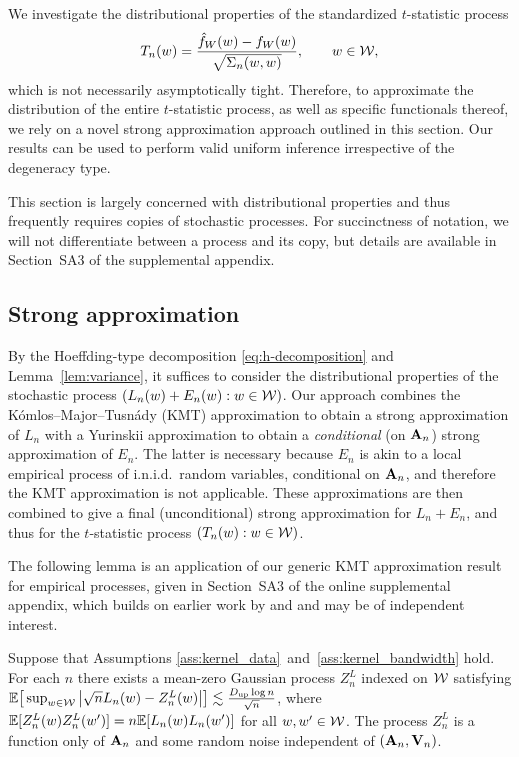We investigate the distributional properties of the
standardized $t$-statistic process
%
\[ T_n(w) = \frac{\hat{f}_W(w) - f_W(w)}{\sqrt{\Sigma_n(w,w)}}
, \qquad w\in\mathcal{W},\]
%
which is not necessarily asymptotically tight.
Therefore, to approximate the distribution of the entire $t$-statistic process,
as well as specific functionals thereof, we rely on a novel strong approximation
approach outlined in this section.
Our results can be used to perform valid uniform inference irrespective of the
degeneracy type.

This section is largely concerned with distributional properties and thus
frequently requires copies of stochastic processes.
For succinctness of notation, we will not differentiate between a process
and its copy, but details are available in
Section~SA3 of the supplemental appendix.

\subsection{Strong approximation}

By the Hoeffding-type decomposition
\eqref{eq:h-decomposition} and Lemma~\ref{lem:variance},
it suffices to consider the distributional properties
of the stochastic process $(L_n(w)+E_n(w):w\in\mathcal{W})$.
Our approach combines the K\'omlos--Major--Tusn\'ady (KMT) approximation
\citep{komlos1975approximation} to obtain a strong approximation of
$L_n$ with a Yurinskii approximation
\citep{yurinskii1978error} to obtain a
\emph{conditional} (on $\mathbf{A}_n$) strong approximation of
$E_n$.
The latter is necessary because
$E_n$ is akin to a local empirical process of i.n.i.d.\
random variables, conditional on $\mathbf{A}_n$,
and therefore the KMT approximation is not applicable.
These approximations are then combined to give a final
(unconditional) strong approximation for $L_n+E_n$,
and thus for the $t$-statistic process
$(T_n(w):w\in\mathcal{W})$.

The following lemma is an application of our generic
KMT approximation result for empirical processes,
given in Section~SA3 of
the online supplemental appendix,
which builds on earlier work by \citet{gine2004kernel}
and \citet{gine2010confidence} and may be of independent interest.

\begin{lemma}
  \label{lem:strong_approx_Ln}
  Suppose that Assumptions
  \ref{ass:kernel_data}~and~\ref{ass:kernel_bandwidth} hold.
  For each $n$ there exists
  a mean-zero Gaussian process
  $Z^L_n$ indexed on $\mathcal{W}$ satisfying
  $\mathbb{E}\big[ \sup_{w \in \mathcal{W}} \big| \sqrt{n} L_n(w) -  Z_n^L(w) \big| \big]
  \lesssim \frac{D_{\textup{up}} \log n}{\sqrt{n}}$,
  where $\mathbb{E}[Z_n^L(w)Z_n^L(w')] =  n\mathbb{E}[L_n(w)L_n(w')]$ for all $w, w' \in \mathcal{W}$.
  The process $Z_n^L$
  is a function only of $\mathbf{A}_n$ and some random noise
  independent of $(\mathbf{A}_n, \mathbf{V}_n)$.
\end{lemma}


